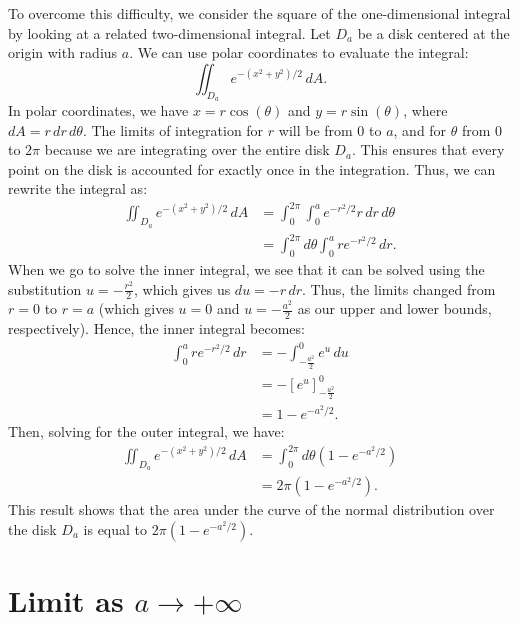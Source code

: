 \documentclass{article}
\begin{document}
To overcome this difficulty, we consider the square of the one-dimensional integral by looking at a related two-dimensional integral. Let \(D_{a}\) be a disk centered at the origin with radius \(a\). We can use polar coordinates to evaluate the integral:
\[
    \iint_{D_{a}} e^{-(x^2 + y^2) / 2} \, dA.
\]
In polar coordinates, we have \(x = r\cos(\theta)\) and \(y = r\sin(\theta)\), where \(dA = r \, dr \, d\theta\). The limits of integration for \(r\) will be from 0 to \(a\), and for \(\theta\) from 0 to \(2\pi\) because we are integrating over the entire disk \(D_a\). This ensures that every point on the disk is accounted for exactly once in the integration. Thus, we can rewrite the integral as:
\begin{align*}
    \iint_{D_{a}} e^{-(x^2 + y^2) / 2} \, dA &= \int_0^{2\pi} \int_0^{a} e^{-r^2 / 2} r \, dr \, d\theta \\
    &= \int_0^{2\pi} d\theta \int_0^{a} r e^{-r^2 / 2} \, dr.
\end{align*}
When we go to solve the inner integral, we see that it can be solved using the substitution \(u = -\frac{r^2}{2}\), which gives us \(du = -r \, dr\). Thus, the limits changed from \(r = 0\) to \(r = a\) (which gives \(u = 0\) and \(u = -\frac{a^2}{2}\) as our upper and lower bounds, respectively). Hence, the inner integral becomes:
\begin{align*}
    \int_0^{a} r e^{-r^2 / 2} \, dr &= -\int_{-\frac{a^2}{2}}^{0} e^{u} \, du \\
    &= -\left[e^{u}\right]_{-\frac{a^2}{2}}^{0} \\
    &= 1 - e^{-a^2 / 2}.
\end{align*}
\newpage
Then, solving for the outer integral, we have:
\begin{align*}
    \iint_{D_{a}} e^{-(x^2 + y^2) / 2} \, dA &= \int_0^{2\pi} d\theta \left(1 - e^{-a^2 / 2}\right) \\
    &= 2\pi \left(1 - e^{-a^2 / 2}\right).
\end{align*}
This result shows that the area under the curve of the normal distribution over the disk \(D_{a}\) is equal to \(2\pi\left(1 - e^{-a^2 / 2}\right)\).

\section{Limit as \(a \to +\infty\)}
\end{document}

